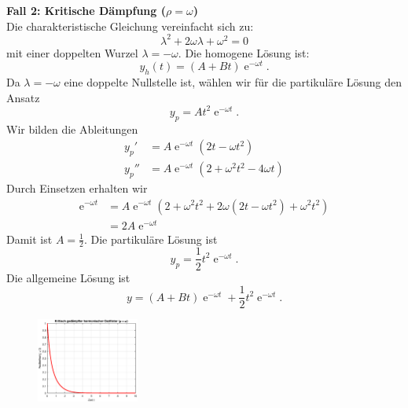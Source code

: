 {\noindent
\textbf{Fall 2: Kritische Dämpfung (\(\rho = \omega\))} \\
Die charakteristische Gleichung vereinfacht sich zu:
\[
\lambda^2 + 2\omega \lambda + \omega^2 = 0
\]
mit einer doppelten Wurzel \(\lambda = -\omega\). Die homogene Lösung ist:
\[
y_h(t) =(A+Bt) \operatorname{e}^{-\omega t}.
\]
Da $\lambda = -\omega$ eine doppelte Nullstelle ist, wählen wir für die partikuläre 
Lösung den Ansatz
$$
y_p = At^2 \operatorname{e}^{-\omega t}.
$$
Wir bilden die Ableitungen
\begin{align*}
y_p' &= A\operatorname{e}^{-\omega t}(2t - \omega t^2)\\
y_p''& = A\operatorname{e}^{-\omega t}(2 +\omega^2t^2 - 4\omega t)
\end{align*}
Durch Einsetzen erhalten wir
\begin{align*}
\operatorname{e}^{-\omega t} &= 
A\operatorname{e}^{-\omega t} (2 + \omega^2 t^2 + 2\omega(2t- \omega t^2) + \omega^2 t^2)\\
&= 2A\operatorname{e}^{-\omega t}
\end{align*}
Damit ist $A = \frac{1}{2}$.
Die partikuläre Lösung ist
$$
y_p = \frac{1}{2}t^2 \operatorname{e}^{-\omega t}.
$$
Die allgemeine Lösung ist
$$
y = (A+Bt) \operatorname{e}^{-\omega t} + \frac{1}{2}t^2 \operatorname{e}^{-\omega t}.
$$

\begin{figure}[h]
    \centering
    \includegraphics[width=0.3\textwidth]{kritischegedaempfterHarOszil.eps}
\end{figure}

}
